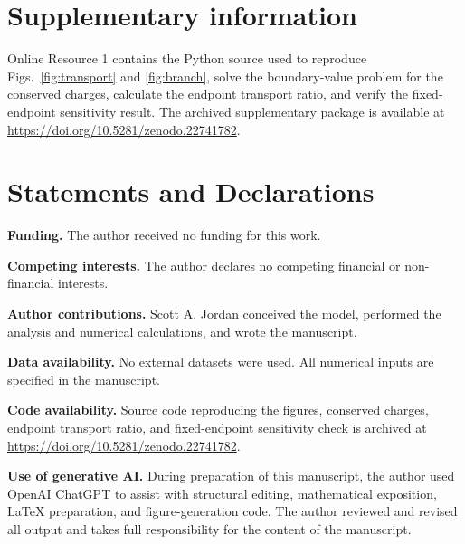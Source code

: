 \documentclass[11pt]{article}
\theoremstyle{plain}
\begin{document}
\section*{Supplementary information}

Online Resource 1 contains the Python source used to reproduce
Figs.~\ref{fig:transport} and \ref{fig:branch}, solve the boundary-value
problem for the conserved charges, calculate the endpoint transport ratio, and
verify the fixed-endpoint sensitivity result.  The archived supplementary
package is available at
\url{https://doi.org/10.5281/zenodo.22741782}.

\section*{Statements and Declarations}

\noindent\textbf{Funding.} The author received no funding for this work.

\noindent\textbf{Competing interests.} The author declares no competing financial or non-financial interests.

\noindent\textbf{Author contributions.} Scott A. Jordan conceived the model, performed the analysis and numerical calculations, and wrote the manuscript.

\noindent\textbf{Data availability.} No external datasets were used. All numerical inputs are specified in the manuscript.

\noindent\textbf{Code availability.} Source code reproducing the figures,
conserved charges, endpoint transport ratio, and fixed-endpoint sensitivity
check is archived at
\url{https://doi.org/10.5281/zenodo.22741782}.

\noindent\textbf{Use of generative AI.} During preparation of this manuscript, the author used OpenAI ChatGPT to assist with structural editing, mathematical exposition, LaTeX preparation, and figure-generation code. The author reviewed and revised all output and takes full responsibility for the content of the manuscript.

\begingroup
\small
\setlength{\bibsep}{3pt}


\endgroup
\end{document}
